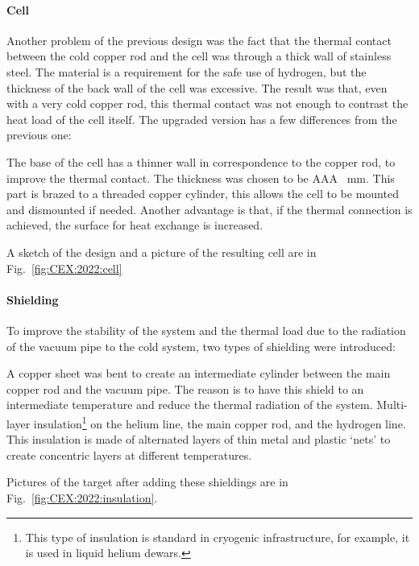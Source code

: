 \begin{refsection}
        \paragraph{Cell} Another problem of the previous design was the fact that the thermal contact between the cold copper rod and the cell was through a thick wall of stainless steel. 
        The material is a requirement for the safe use of hydrogen, but the thickness of the back wall of the cell was excessive.
        The result was that, even with a very cold copper rod, this thermal contact was not enough to contrast the heat load of the cell itself.
        The upgraded version has a few differences from the previous one:
        \begin{outline}
            \1 The base of the cell has a thinner wall in correspondence to the copper rod, to improve the thermal contact. The thickness was chosen to be AAA \SI{}{mm}.
            \1 This part is brazed to a threaded copper cylinder, this allows the cell to be mounted and dismounted if needed. 
            Another advantage is that, if the thermal connection is achieved, the surface for heat exchange is increased.
        \end{outline}
        A sketch of the design and a picture of the resulting cell are in Fig.~\ref{fig:CEX:2022:cell}
        
        \paragraph{Shielding} To improve the stability of the system and the thermal load due to the radiation of the vacuum pipe to the cold system, two types of shielding were introduced:
        \begin{outline}
            \1 A copper sheet was bent to create an intermediate cylinder between the main copper rod and the vacuum pipe. The reason is to have this shield to an intermediate temperature and reduce the thermal radiation of the system. 
            \1 Multi-layer insulation\footnote{This type of insulation is standard in cryogenic infrastructure, for example, it is used in liquid helium dewars.} on the helium line, the main copper rod, and the hydrogen line. This insulation is made of alternated layers of thin metal and plastic `nets' to create concentric layers at different temperatures. 
        \end{outline}
        Pictures of the target after adding these shieldings are in Fig.~\ref{fig:CEX:2022:insulation}. 


\end{refsection}
